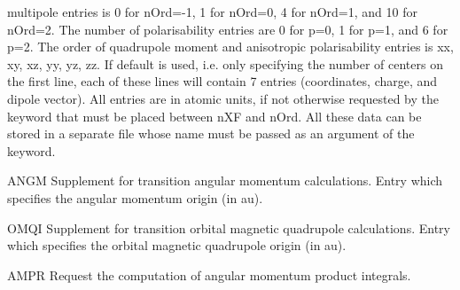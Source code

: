 \begin{keywordlist}
multipole entries is 0 for nOrd=-1, 1 for nOrd=0, 4 for nOrd=1, and 10 for nOrd=2. The number of
polarisability entries are 0 for p=0, 1 for p=1, and 6 for p=2. The order of quadrupole moment and
anisotropic polarisability entries is xx, xy, xz, yy, yz, zz. If default is used, i.e. only specifying
the number of centers on the first line, each of these lines will contain 7 entries (coordinates,
charge, and dipole vector). All entries are in atomic units, if not otherwise requested by the 
keyword that must be placed between nXF and nOrd. All these data can be stored in a separate file whose
name must be passed as an argument of the  keyword.
\item[ANGM]
Supplement
 for transition angular momentum calculations.
Entry which specifies the angular momentum origin (in au).
\item[OMQI]
Supplement
 for transition orbital magnetic quadrupole calculations.
Entry which specifies the orbital magnetic quadrupole origin (in au).
\item[AMPR]
Request the computation of angular momentum product integrals.

\end{keywordlist}
